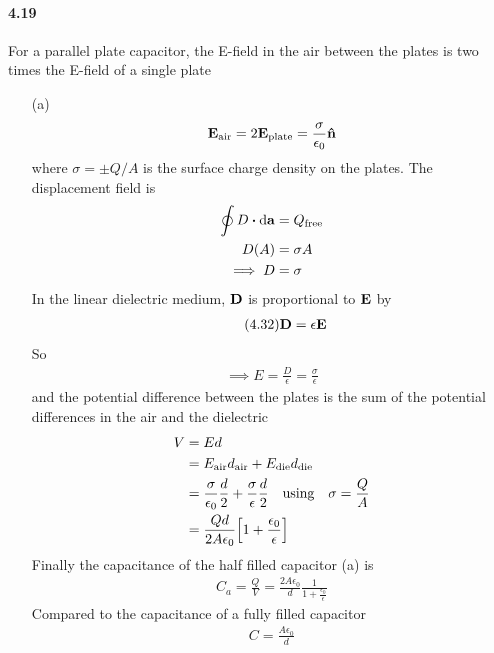 \documentclass[../main.tex]{subfiles}
\begin{document}
\paragraph{4.19} For a parallel plate capacitor, the E-field in the air between the plates is two times the E-field of a single plate
\begin{itemize}
    \item [(a)] \begin{align*}
        \vb E_\text{air} = 2\vb E_\text{plate} = \frac{\sigma}{\epsilon_0} \vu n
    \end{align*}
    where $\sigma = \pm Q/A$ is the surface charge density on the plates. The displacement field is
    \begin{align*}
        \oint D \vdot \dd{\vb a} &= Q_\text{free} \\
        D (A) &= \sigma A \\
        \implies D &= \sigma
    \end{align*}
    In the linear dielectric medium, $\vb D$ is proportional to $\vb E$ by
    \begin{align*} \tag{4.32} \label{eq:4.32}
        \vb D = \epsilon \vb E
    \end{align*}
    So
    \begin{align*}
        \implies E = \frac{D}{\epsilon} = \frac{\sigma}{\epsilon}
    \end{align*}
    and the potential difference between the plates is the sum of the potential differences in the air and the dielectric
    \begin{align*}
        V &= E d \\
        &= E_\text{air} d_\text{air} + E_\text{die} d_\text{die} \\
        &= \frac{\sigma}{\epsilon_0} \frac{d}{2} + \frac{\sigma}{\epsilon} \frac{d}{2} \qusing \sigma = \frac{Q}{A} \\
        &= \frac{Qd}{2A\epsilon_0} \qt[1 + \frac{\epsilon_0}{\epsilon}] \\
    \end{align*}
    Finally the capacitance of the half filled capacitor (a) is
    \begin{align*}
        C_a = \frac{Q}{V} = \frac{2A\epsilon_0}{d} \frac{1}{1 + \frac{\epsilon_0}{\epsilon}}
    \end{align*}
    Compared to the capacitance of a fully filled capacitor
    \begin{align*} \tag{2.54} \label{eq:2.54}
        C = \frac{A\epsilon_0}{d} 
    \end{align*}

\end{itemize}
\end{document}
